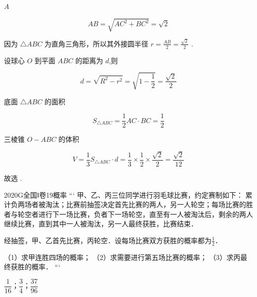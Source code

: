\documentclass[12pt,UTF-8,a4paper]{ctexart}
\numberwithin{figure}{section}
\theoremstyle{mystyle}
\theoremstyle{mystylekaishu}
\theoremstyle{mystyle}
\numberwithin{xiti}{section}
\begin{document}
\begin{answer}
$A$
\end{answer}

\begin{solutions}
$$
AB = \sqrt{AC^2 + BC^2} = \sqrt{2}
$$

因为 $\triangle ABC$ 为直角三角形，所以其外接圆半径 $r = \frac{AB}{2} = \frac{\sqrt{2}}{2}$ .

设球心 $O$ 到平面 $ABC$ 的距离为 $d$,则

$$
d = \sqrt{R^2 - r^2} = \sqrt{1 - \frac{1}{2}} = \frac{\sqrt{2}}{2}
$$

底面 $\triangle ABC$ 的面积

$$
S_{\triangle ABC} = \frac{1}{2} AC \cdot BC = \frac{1}{2}
$$

三棱锥 $O-ABC$ 的体积

$$
V = \frac{1}{3} S_{\triangle ABC} \cdot d = \frac{1}{3} \times \frac{1}{2} \times \frac{\sqrt{2}}{2} = \frac{\sqrt{2}}{12}
$$

故选  .
\end{solutions}


\begin{problem}{2020}{G}{全国Ⅰ卷}{19}{概率}
```
甲、乙、丙三位同学进行羽毛球比赛，约定赛制如下：  
累计负两场者被淘汰；比赛前抽签决定首先比赛的两人，另一人轮空；每场比赛的胜者与轮空者进行下一场比赛，负者下一场轮空，直至有一人被淘汰后，剩余的两人继续比赛，直到其中一人被淘汰，另一人最终获胜，比赛结束．  

经抽签，甲、乙首先比赛，丙轮空．设每场比赛双方获胜的概率都为$\frac{1}{2}$．  

（1）求甲连胜四场的概率；  
（2）求需要进行第五场比赛的概率；  
（3）求丙最终获胜的概率．
```
\end{problem}

\begin{answer}
$\dfrac{1}{16}；\dfrac{3}{4}；\dfrac{37}{96}$
\end{answer}
\end{document}
